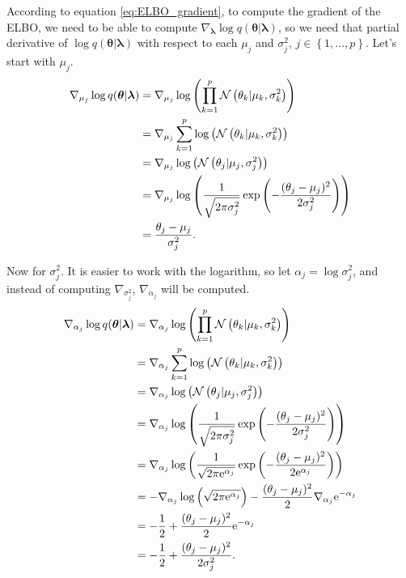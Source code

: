 According to equation \eqref{eq:ELBO_gradient}, to compute the gradient of the ELBO, we need to be able to compute $\nabla_{\boldsymbol{\lambda}} \log q(\boldsymbol{\theta} | \boldsymbol{\lambda})$, so we need that partial derivative of $\log q(\boldsymbol{\theta} | \boldsymbol{\lambda})$ with respect to each $\mu_j$ and $\sigma_j^2$, $j \in \left\{ 1, \hdots, p \right\}$. Let's start with $\mu_j$.
\begin{equation}
  \begin{split}
      \nabla_{\mu_j} \log q(\boldsymbol{\theta} | \boldsymbol{\lambda}) & =
      \nabla_{\mu_j} \log \left( \prod_{ k = 1}^p \mathcal{N}\left( \theta_k | \mu_k, \sigma_k^2 \right) \right) \\
      &= \nabla_{\mu_j} \sum_{ k = 1}^p \log \left( \mathcal{N}\left( \theta_k | \mu_k, \sigma_k^2 \right) \right) \\
      &= \nabla_{\mu_j} \log \left( \mathcal{N}\left( \theta_j | \mu_j, \sigma_j^2 \right) \right) \\
      &= \nabla_{\mu_j} \log \left( \frac{1}{\sqrt{2 \pi \sigma_j^2}} \exp \left( -\frac{(\theta_j - \mu_j)^2}{2 \sigma_j^2} \right) \right) \\
      &= \frac{\theta_j - \mu_j}{\sigma_j^2}.
  \end{split}
\end{equation}

Now for $\sigma_j^2$. It is easier to work with the logarithm, so let $\alpha_j = \log \sigma_j^2$, and instead of computing $\nabla_{\sigma_j^2}$, $\nabla_{\alpha_j}$ will be computed.
\begin{equation}
  \begin{split}
      \nabla_{\alpha_j} \log q(\boldsymbol{\theta} | \boldsymbol{\lambda}) & =
      \nabla_{\alpha_j} \log \left( \prod_{ k = 1}^p \mathcal{N}\left( \theta_k | \mu_k, \sigma_k^2 \right) \right) \\
      &= \nabla_{\alpha_j} \sum_{ k = 1}^p \log \left( \mathcal{N}\left( \theta_k | \mu_k, \sigma_k^2 \right) \right) \\
      &= \nabla_{\alpha_j} \log \left( \mathcal{N}\left( \theta_j | \mu_j, \sigma_j^2 \right) \right) \\
      &= \nabla_{\alpha_j} \log \left( \frac{1}{\sqrt{2 \pi \sigma_j^2}} \exp \left( -\frac{(\theta_j - \mu_j)^2}{2 \sigma_j^2} \right) \right) \\
      &= \nabla_{\alpha_j} \log \left( \frac{1}{\sqrt{2 \pi \mathrm{e}^{\alpha_j}}} \exp \left( -\frac{(\theta_j - \mu_j)^2}{2 \mathrm{e}^{\alpha_j}} \right) \right) \\
      &= - \nabla_{\alpha_j} \log \left( \sqrt{2 \pi \mathrm{e}^{\alpha_j}} \right) - \frac{(\theta_j - \mu_j)^2}{2} \nabla_{\alpha_j} \mathrm{e}^{-\alpha_j}\\
      &= - \frac{1}{2} + \frac{(\theta_j - \mu_j)^2}{2} \mathrm{e}^{-\alpha_j} \\
      &= - \frac{1}{2} + \frac{(\theta_j - \mu_j)^2}{2 \sigma_j^2}.
  \end{split}
\end{equation}

